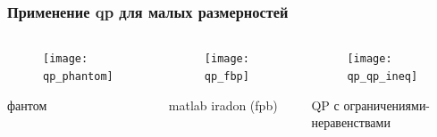 \begin{frame}
\frametitle{Применение qp для малых размерностей}
\begin{columns}[T,onlytextwidth]
  \hspace*{-1cm}
\begin{column}{0.4\textwidth}
  \begin{figure}
    \centering
    \texttt{[image: qp\_phantom]}
  \end{figure}
  фантом
\end{column}

\begin{column}{0.4\textwidth}
  \begin{figure}
    \centering
    \texttt{[image: qp\_fbp]}
  \end{figure}
  matlab iradon (fpb)
\end{column}

\begin{column}{0.4\textwidth}
    \begin{figure}
    \centering
    \texttt{[image: qp\_qp\_ineq]}
  \end{figure}
  QP с ограничениями-неравенствами
\end{column}
\end{columns}

\end{frame}

